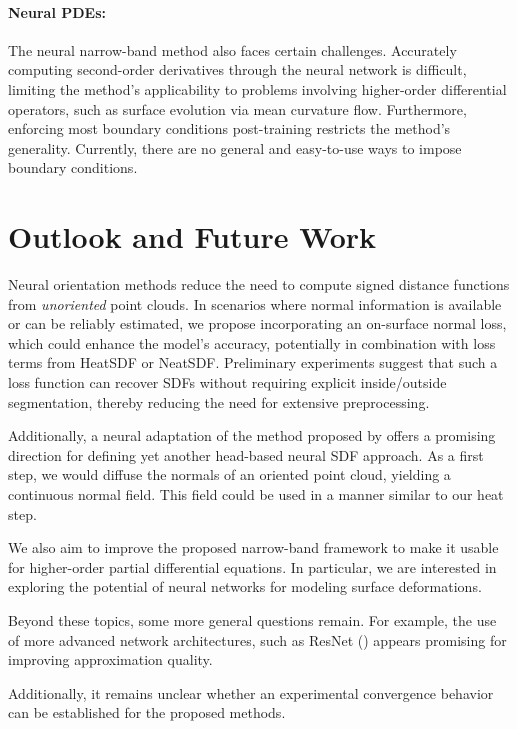 \documentclass[12pt,openany]{book}
\theoremstyle{plainnormal}
\theoremstyle{remark}
\begin{document}
\paragraph{Neural PDEs:} The neural narrow-band method also faces certain challenges. Accurately computing second-order derivatives through the neural network is difficult, limiting the method's applicability to problems involving higher-order differential operators, such as surface evolution via mean curvature flow. Furthermore, enforcing most boundary conditions post-training restricts the method's generality. Currently, there are no general and easy-to-use ways to impose boundary conditions. 
\section{Outlook and Future Work}
Neural orientation methods reduce the need to compute signed distance functions from \emph{unoriented} point clouds. In scenarios where normal information is available or can be reliably estimated, we propose incorporating an on-surface normal loss, which could enhance the model's accuracy, potentially in combination with loss terms from HeatSDF or NeatSDF. Preliminary experiments suggest that such a loss function can recover SDFs without requiring explicit inside/outside segmentation, thereby reducing the need for extensive preprocessing.\par
Additionally, a neural adaptation of the method proposed by \cite{FengCrane} offers a promising direction for defining yet another head-based neural SDF approach. As a first step, we would diffuse the normals of an oriented point cloud, yielding a continuous normal field. This field could be used in a manner similar to our heat step.\par
We also aim to improve the proposed narrow-band framework to make it usable for higher-order partial differential equations. In particular, we are interested in exploring the potential of neural networks for modeling surface deformations.\par
Beyond these topics, some more general questions remain. For example, the use of more advanced network architectures, such as ResNet (\cite{he2015deepresiduallearningimage}) appears promising for improving approximation quality. \par
Additionally, it remains unclear whether an experimental convergence behavior can be established for the proposed methods.
\endgroup
{
\setlength{\bibsep}{5pt}


}
\end{document}

